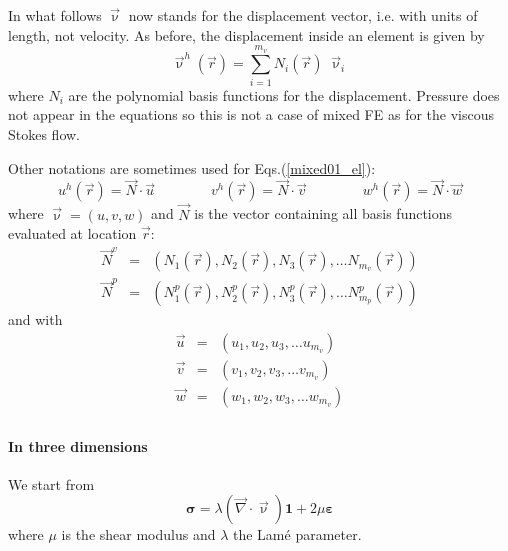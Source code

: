 
In what follows $\vec\upnu$ now stands for the displacement vector, i.e. 
with units of length, not velocity. 
As before, the displacement inside an element is given by 
\begin{equation}
{\vec \upnu}^h({\vec r})=\sum_{i=1}^{m_v} N_i({\vec r})\;  {\vec \upnu}_i
\label{mixed01_el}
\end{equation}
where $N_i$ are the polynomial basis functions for the displacement.
Pressure does not appear in the equations so this is not a case of 
mixed FE as for the viscous Stokes flow. 

Other notations are sometimes used for Eqs.(\ref{mixed01_el}):
\begin{equation}
u^h({\vec r}) = \vec{N} \cdot \vec{u}
\quad\quad\quad\quad
v^h({\vec r}) = \vec{N} \cdot \vec{v}
\quad\quad\quad\quad
w^h({\vec r}) = \vec{N} \cdot \vec{w}
\end{equation} 
where ${\vec \upnu}=(u,v,w)$ and $\vec{N}$ 
is the vector containing all basis functions evaluated at location ${\vec r}$:
\begin{eqnarray}
\vec{N}^v &=& \left( N_1({\vec r}),  N_2({\vec r}),  N_3({\vec r}), \dots  N_{m_v}({\vec r}) \right) \\
\vec{N}^p &=& \left( N_1^p({\vec r}),  N_2^p({\vec r}),  N_3^p({\vec r}), \dots  N_{m_p}^p({\vec r}) \right)
\end{eqnarray}
and with 
\begin{eqnarray}
\vec{u} &=& \left( u_1,  u_2,  u_3, \dots  u_{m_v} \right) \\
\vec{v} &=& \left( v_1,  v_2,  v_3, \dots  v_{m_v} \right) \\
\vec{w} &=& \left( w_1,  w_2,  w_3, \dots  w_{m_v} \right) \\
\end{eqnarray}

\paragraph{In three dimensions} We start from
\[
{\bm \sigma} = \lambda (\vec\nabla\cdot \vec\upnu) {\bm 1}+ 2\mu {\bm \varepsilon}
\]
where $\mu$ is the shear modulus and $\lambda$ the Lam{\'e} parameter.

